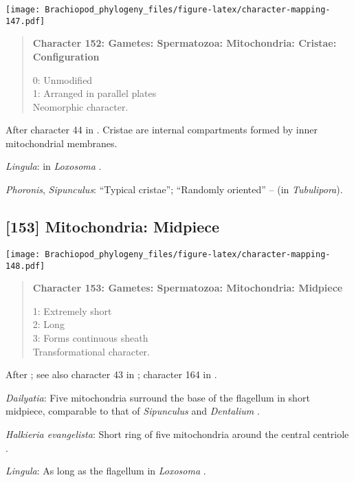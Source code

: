 \documentclass[openany]{book}
\theoremstyle{definition}
\theoremstyle{definition}
\theoremstyle{definition}
\theoremstyle{remark}
\begin{document}
\texttt{[image: Brachiopod\_phylogeny\_files/figure-latex/character-mapping-147.pdf]}

\begin{quote}
\textbf{Character 152: Gametes: Spermatozoa: Mitochondria: Cristae:
Configuration}

0: Unmodified\\
1: Arranged in parallel plates\\
Neomorphic character.
\end{quote}

After character 44 in \citet{Ponder1997}. Cristae are internal
compartments formed by inner mitochondrial membranes.

\hypertarget{Lingula-coding-152}{}
\emph{Lingula}: in \emph{Loxosoma} \citep{Franzen2000}.

\hypertarget{Phoronis-coding-152}{}
\emph{Phoronis}, \emph{Sipunculus}: ``Typical cristae''; ``Randomly
oriented'' -- \citet{Franzen1984} (in \emph{Tubulipora}).

\subsection*{{[}153{]} Mitochondria:
Midpiece}\label{mitochondria-midpiece}

\texttt{[image: Brachiopod\_phylogeny\_files/figure-latex/character-mapping-148.pdf]}

\begin{quote}
\textbf{Character 153: Gametes: Spermatozoa: Mitochondria: Midpiece}

1: Extremely short\\
2: Long\\
3: Forms continuous sheath\\
Transformational character.
\end{quote}

After \citet{Smith2012}; see also character 43 in \citet{Ponder1997};
character 164 in \citet{Giribet2002}.

\hypertarget{Dailyatia-coding-153}{}
\emph{Dailyatia}: Five mitochondria surround the base of the flagellum
in short midpiece, comparable to that of \emph{Sipunculus} and
\emph{Dentalium} \citep{Gherardi2011}.

\hypertarget{Halkieria_evangelista-coding-153}{}
\emph{Halkieria evangelista}: Short ring of five mitochondria around the
central centriole \citep{Rice1993}.

\hypertarget{Lingula-coding-153}{}
\emph{Lingula}: As long as the flagellum in \emph{Loxosoma}
\citep{Franzen2000}.
\end{document}
